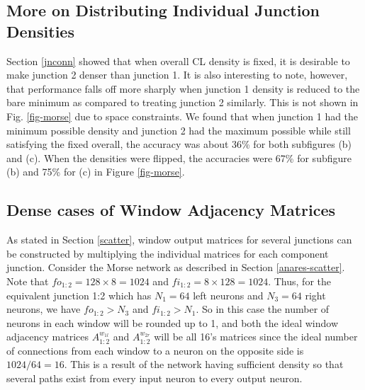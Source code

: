 \documentclass[conference]{IEEEtran}
\begin{document}
\subsection{More on Distributing Individual Junction Densities}\label{appendix-jnconn}
Section \ref{jnconn} showed that when overall CL density is fixed, it is desirable to make junction 2 denser than junction 1. It is also interesting to note, however, that performance falls off more sharply when junction 1 density is reduced to the bare minimum as compared to treating junction 2 similarly. This is not shown in Fig. \ref{fig-morse} due to space constraints. We found that when junction 1 had the minimum possible density and junction 2 had the maximum possible while still satisfying the fixed overall, the accuracy was about 36\% for both subfigures (b) and (c). When the densities were flipped, the accuracies were 67\% for subfigure (b) and 75\% for (c) in Figure \ref{fig-morse}.

\subsection{Dense cases of Window Adjacency Matrices}\label{appendix-window-adjmat}
As stated in Section \ref{scatter}, window output matrices for several junctions can be constructed by multiplying the individual matrices for each component junction. Consider the Morse network as described in Section \ref{anares-scatter}. Note that $fo_{1:2}=128\times8=1024$ and $fi_{1:2}=8\times128=1024$. Thus, for the equivalent junction 1:2 which has $N_1=64$ left neurons and $N_3=64$ right neurons, we have $fo_{1:2}>N_3$ and $fi_{1:2}>N_1$. So in this case the number of neurons in each window will be rounded up to 1, and both the ideal window adjacency matrices $A_{1:2}^{w_{1l}}$ and $A_{1:2}^{w_{2r}}$ will be all 16's matrices since the ideal number of connections from each window to a neuron on the opposite side is $1024/64=16$. This is a result of the network having sufficient density so that several paths exist from every input neuron to every output neuron. %
\end{document}

